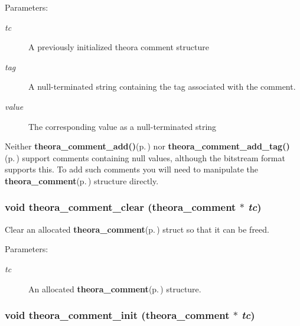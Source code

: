 \begin{Desc}
\item[Parameters:]
\begin{description}
\item[{\em tc}]A previously initialized theora comment structure \item[{\em tag}]A null-terminated string containing the tag associated with the comment. \item[{\em value}]The corresponding value as a null-terminated string\end{description}
\end{Desc}
Neither {\bf theora\_\-comment\_\-add()}{\rm (p.\,\pageref{theora_8h_795da8fab8fe137dea276d6bf20bf5f2})} nor {\bf theora\_\-comment\_\-add\_\-tag()}{\rm (p.\,\pageref{theora_8h_adc406fcdc1d2192ae2a9adfb3bd4e6f})} support comments containing null values, although the bitstream format supports this. To add such comments you will need to manipulate the {\bf theora\_\-comment}{\rm (p.\,\pageref{structtheora__comment})} structure directly. 
\subsubsection{\setlength{\rightskip}{0pt plus 5cm}void theora\_\-comment\_\-clear ({\bf theora\_\-comment} $\ast$ {\em tc})}\label{theora_8h_7cabfa586d5e0ecae1dedd7c05d6a1fe}


Clear an allocated {\bf theora\_\-comment}{\rm (p.\,\pageref{structtheora__comment})} struct so that it can be freed. 

\begin{Desc}
\item[Parameters:]
\begin{description}
\item[{\em tc}]An allocated {\bf theora\_\-comment}{\rm (p.\,\pageref{structtheora__comment})} structure. \end{description}
\end{Desc}
\subsubsection{\setlength{\rightskip}{0pt plus 5cm}void theora\_\-comment\_\-init ({\bf theora\_\-comment} $\ast$ {\em tc})}\label{theora_8h_531adee5230be7d45af1dede0e82c79a}


